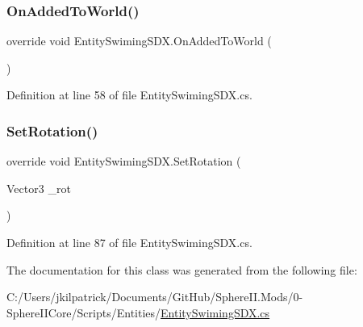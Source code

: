 \subsubsection{\texorpdfstring{OnAddedToWorld()}{OnAddedToWorld()}}
{\footnotesize\ttfamily override void Entity\+Swiming\+S\+D\+X.\+On\+Added\+To\+World (\begin{DoxyParamCaption}{ }\end{DoxyParamCaption})}



Definition at line 58 of file Entity\+Swiming\+S\+D\+X.\+cs.

\mbox{\label{class_entity_swiming_s_d_x_ac234efe645a6e92f4c73aa182b98d601}} 
\subsubsection{\texorpdfstring{SetRotation()}{SetRotation()}}
{\footnotesize\ttfamily override void Entity\+Swiming\+S\+D\+X.\+Set\+Rotation (\begin{DoxyParamCaption}\item[{Vector3}]{\+\_\+rot }\end{DoxyParamCaption})}



Definition at line 87 of file Entity\+Swiming\+S\+D\+X.\+cs.



The documentation for this class was generated from the following file\+:\begin{DoxyCompactItemize}
\item 
C\+:/\+Users/jkilpatrick/\+Documents/\+Git\+Hub/\+Sphere\+I\+I.\+Mods/0-\/\+Sphere\+I\+I\+Core/\+Scripts/\+Entities/\mbox{\hyperlink{_entity_swiming_s_d_x_8cs}{Entity\+Swiming\+S\+D\+X.\+cs}}\end{DoxyCompactItemize}
